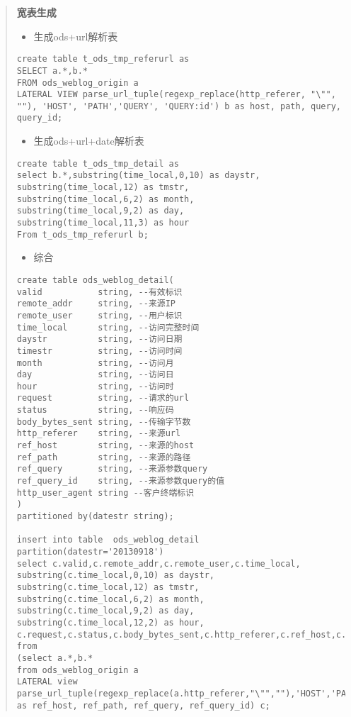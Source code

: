 \begin{quote}
\textbf{宽表生成}

\begin{itemize}
\item
  生成ods+url解析表
\end{itemize}

\begin{verbatim}
create table t_ods_tmp_referurl as
SELECT a.*,b.*
FROM ods_weblog_origin a 
LATERAL VIEW parse_url_tuple(regexp_replace(http_referer, "\"", ""), 'HOST', 'PATH','QUERY', 'QUERY:id') b as host, path, query, query_id;
\end{verbatim}

\begin{itemize}
\item
  生成ods+url+date解析表
\end{itemize}

\begin{verbatim}
create table t_ods_tmp_detail as 
select b.*,substring(time_local,0,10) as daystr,
substring(time_local,12) as tmstr,
substring(time_local,6,2) as month,
substring(time_local,9,2) as day,
substring(time_local,11,3) as hour
From t_ods_tmp_referurl b;
\end{verbatim}

\begin{itemize}
\item
  综合
\end{itemize}

\begin{verbatim}
create table ods_weblog_detail(
valid           string, --有效标识
remote_addr     string, --来源IP
remote_user     string, --用户标识
time_local      string, --访问完整时间
daystr          string, --访问日期
timestr         string, --访问时间
month           string, --访问月
day             string, --访问日
hour            string, --访问时
request         string, --请求的url
status          string, --响应码
body_bytes_sent string, --传输字节数
http_referer    string, --来源url
ref_host        string, --来源的host
ref_path        string, --来源的路径
ref_query       string, --来源参数query
ref_query_id    string, --来源参数query的值
http_user_agent string --客户终端标识
)
partitioned by(datestr string);

insert into table  ods_weblog_detail partition(datestr='20130918') 
select c.valid,c.remote_addr,c.remote_user,c.time_local,
substring(c.time_local,0,10) as daystr,
substring(c.time_local,12) as tmstr,
substring(c.time_local,6,2) as month,
substring(c.time_local,9,2) as day,
substring(c.time_local,12,2) as hour,
c.request,c.status,c.body_bytes_sent,c.http_referer,c.ref_host,c.ref_path,c.ref_query,c.ref_query_id,c.http_user_agent
from 
(select a.*,b.*
from ods_weblog_origin a
LATERAL view 
parse_url_tuple(regexp_replace(a.http_referer,"\"",""),'HOST','PATH','QUERY','QUERY_ID')b as ref_host, ref_path, ref_query, ref_query_id) c;
\end{verbatim}


\end{quote}

